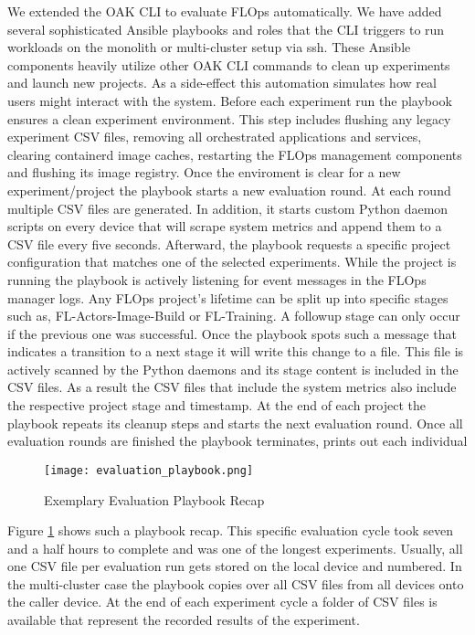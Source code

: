 We extended the OAK CLI to evaluate FLOps automatically.
We have added several sophisticated Ansible playbooks and roles that the CLI triggers to run workloads on the monolith or multi-cluster setup via ssh.
These Ansible components heavily utilize other OAK CLI commands to clean up experiments and launch new projects.
As a side-effect this automation simulates how real users might interact with the system.
Before each experiment run the playbook ensures a clean experiment environment.
This step includes flushing any legacy experiment CSV files, removing all orchestrated applications and services, clearing containerd image caches, restarting the FLOps management components and flushing its image registry.
Once the enviroment is clear for a new experiment/project the playbook starts a new evaluation round.
At each round multiple CSV files are generated.
In addition, it starts custom Python daemon scripts on every device that will scrape system metrics and append them to a CSV file every five seconds.
Afterward, the playbook requests a specific project configuration that matches one of the selected experiments.
While the project is running the playbook is actively listening for event messages in the FLOps manager logs.
Any FLOps project's lifetime can be split up into specific stages such as, FL-Actors-Image-Build or FL-Training.
A followup stage can only occur if the previous one was successful.
Once the playbook spots such a message that indicates a transition to a next stage it will write this change to a file.
This file is actively scanned by the Python daemons and its stage content is included in the CSV files.
As a result the CSV files that include the system metrics also include the respective project stage and timestamp.
At the end of each project the playbook repeats its cleanup steps and starts the next evaluation round.
Once all evaluation rounds are finished the playbook terminates, prints out each individual 
\begin{figure}[h]
        \centering
        \texttt{[image: evaluation\_playbook.png]}
        \caption{Exemplary Evaluation Playbook Recap}
        \label{fig:evaluation_playbook_result}
\end{figure}
Figure \ref{fig:evaluation_playbook_result} shows such a playbook recap.
This specific evaluation cycle took seven and a half hours to complete and was one of the longest experiments.
Usually, all one CSV file per evaluation run gets stored on the local device and numbered.
In the multi-cluster case the playbook copies over all CSV files from all devices onto the caller device.
At the end of each experiment cycle a folder of CSV files is available that represent the recorded results of the experiment.

